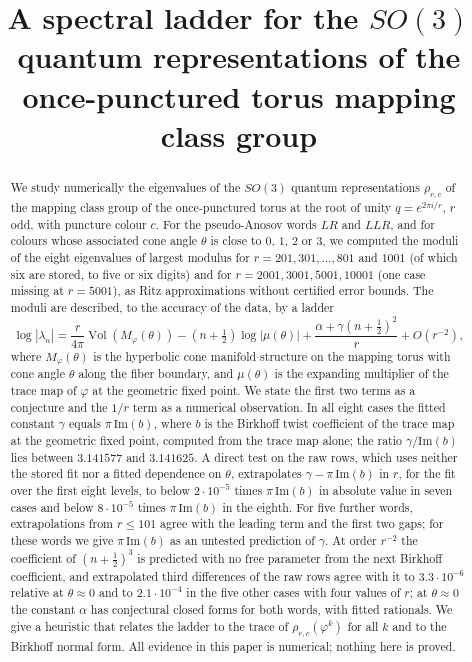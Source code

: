 \documentclass[11pt]{amsart}
\title[A spectral ladder for quantum representations]{A spectral ladder for the $SO(3)$ quantum representations of the once-punctured torus mapping class group}
\author{\todo{author names}}
\date{\todo{date}}
\theoremstyle{definition}
\theoremstyle{remark}
\newcommand{\Vol}{\operatorname{Vol}}
\begin{document}
\begin{abstract}
We study numerically the eigenvalues of the $SO(3)$ quantum representations
$\rho_{r,c}$ of the mapping class group of the once-punctured torus at the root
of unity $q = e^{2\pi i/r}$, $r$ odd, with puncture colour $c$. For the
pseudo-Anosov words $LR$ and $LLR$, and for colours whose associated cone angle
$\theta$ is close to $0$, $1$, $2$ or $3$, we computed the moduli of the eight
eigenvalues of largest modulus for $r = 201, 301, \dots, 801$ and $1001$ (of which
six are stored, to five or six digits) and for $r = 2001, 3001, 5001, 10001$ (one case missing at $r = 5001$),
as Ritz approximations without certified error bounds. The moduli are described, to
the accuracy of the data, by a ladder
\[
\log|\lambda_n| = \frac{r}{4\pi}\Vol(M_\varphi(\theta)) - \left(n+\tfrac12\right)\log|\mu(\theta)|
+ \frac{\alpha + \gamma (n+\frac12)^2}{r} + O(r^{-2}),
\]
where $M_\varphi(\theta)$ is the hyperbolic cone manifold structure on the mapping
torus with cone angle $\theta$ along the fiber boundary, and $\mu(\theta)$ is the
expanding multiplier of the trace map of $\varphi$ at the geometric fixed point.
We state the first two terms as a conjecture and the $1/r$ term as a numerical
observation. In all eight cases the fitted constant $\gamma$ equals
$\pi\,\mathrm{Im}(b)$, where $b$ is the Birkhoff twist coefficient of the trace map
at the geometric fixed point, computed from the trace map alone; the ratio
$\gamma/\mathrm{Im}(b)$ lies between $3.141577$ and $3.141625$. A direct test on the
raw rows, which uses neither the stored fit nor a fitted dependence on $\theta$,
extrapolates $\gamma - \pi\,\mathrm{Im}(b)$ in $r$, for the fit over the first eight
levels, to below $2\cdot10^{-5}$ times
$\pi\,\mathrm{Im}(b)$ in absolute value in seven cases and below $8\cdot10^{-5}$ times
$\pi\,\mathrm{Im}(b)$ in the eighth. For five
further words, extrapolations from $r \le 101$ agree with the leading term and the
first two gaps; for these words we give $\pi\,\mathrm{Im}(b)$ as an untested
prediction of $\gamma$. At order $r^{-2}$ the coefficient of $(n+\frac12)^3$ is
predicted with no free parameter from the next Birkhoff coefficient, and extrapolated
third differences of the raw rows agree with it to $3.3\cdot10^{-6}$ relative at
$\theta \approx 0$ and to $2.1\cdot10^{-4}$ in the five other cases with four values of
$r$; at $\theta \approx 0$ the constant $\alpha$ has conjectural closed forms for both
words, with fitted rationals. We give a heuristic
that relates the ladder to the trace of $\rho_{r,c}(\varphi^k)$ for all $k$ and to the
Birkhoff normal form. All evidence in this paper is numerical; nothing here is
proved.
\end{abstract}
\end{document}
